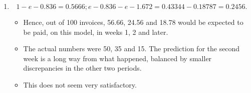 \documentclass[a4paper,12pt]{article}
\begin{document}
\begin{enumerate}
It is easy to check that this is indeed a maximum; e.g. ( )

\[2
2 2
log 85 0
1
d L
d\lambdaeλ
= - <
-
.\]
\item  \[1- e-0.836 = 0.5666; e-0.836 - e-1.672 = 0.43344 - 0.18787 = 0.2456 . \]

\begin{itemize}
\item Hence, out
of 100 invoices, 56.66, 24.56 and 18.78 would be expected to be paid, on this model,
in weeks 1, 2 and later. 
\item The actual numbers were 50, 35 and 15. The prediction for
the second week is a long way from what happened, balanced by smaller
discrepancies in the other two periods. 
\item This does not seem very satisfactory.
\end{itemize}
\end{enumerate}
\end{document}
